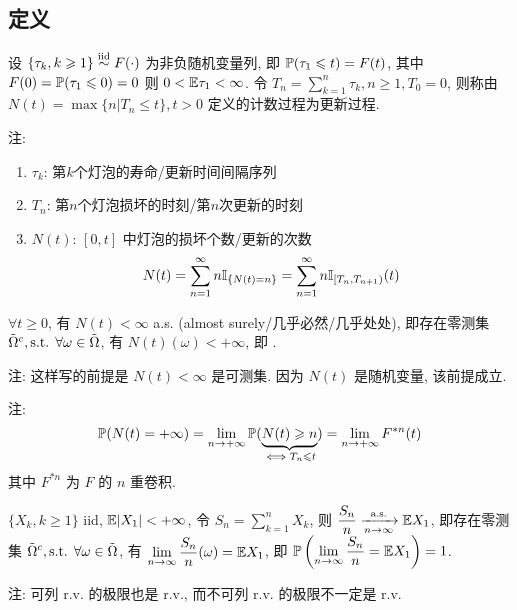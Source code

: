 \subsection{定义}

\begin{definition}
    设 $\{\tau_k,k\geqslant 1\}\overset{\text{iid}}{\sim} F(\cdot)$ 为非负随机变量列, 即 $\mathbb{P}(\tau_1\leqslant t)=F(t)$, 其中 $F(0)=\mathbb{P}(\tau_1\leqslant 0)=0$ 则 $0<\mathbb E \tau_1<\infty$. 令 $T_n=\sum_{k=1}^n\tau_k,n\geq 1,T_0=0$, 则称由 $N(t)=\max\{n|T_n\leq t\}, t>0$ 定义的计数过程为更新过程.  
\end{definition}
注:
\begin{enumerate}
    \item $\tau_k$: 第$k$个灯泡的寿命/更新时间间隔序列
    \item $T_n$: 第$n$个灯泡损坏的时刻/第$n$次更新的时刻
    \item $N(t)$: $[0,t]$ 中灯泡的损坏个数/更新的次数
    \[
    N(t)=\sum_{n=1}^{\infty}n\mathbb I_{\{N(t)=n\}}=\sum_{n=1}^{\infty}n\mathbb I_{[T_n,T_{n+1})}(t)
    \]
\end{enumerate}

\begin{lemma}\label{lem:p113-lem1}
    $\forall t\geq 0$, 有 $N(t)<\infty$ a.s. (almost surely/几乎必然/几乎处处), 即存在零测集 $\tilde{\Omega}^c,\text{s.t. } \forall \omega \in \tilde{\Omega}$, 有 $N(t)(\omega)<+\infty$, 即 .

    注: 这样写的前提是 $N(t)<\infty$ 是可测集. 因为 $N(t)$ 是随机变量, 该前提成立.
\end{lemma}

注:
\[
    \mathbb{P}(N(t)=+\infty)=\lim_{n\to +\infty}\mathbb{P}(\underbrace{N(t)\geqslant n}_{\iff T_n\leqslant t})=\lim_{n\to +\infty}F^{*n}(t)
\]
其中 $F^{*n}$ 为 $F$ 的 $n$ 重卷积.

\begin{theorem}[强大数定律]
    $\{X_k,k\geq 1\}$ iid, $\mathbb E |X_1|<+\infty$, 令 $S_n=\sum_{k=1}^nX_k$, 则 $\displaystyle \frac{S_n}{n}\xrightarrow[n\to\infty]{\text{a.s.}} \mathbb E X_1$, 即存在零测集 $\displaystyle \tilde{\Omega}^c,\text{s.t. } \forall \omega \in \tilde{\Omega}$, 有 $\displaystyle \lim_{n\to\infty}\frac{S_n}{n}(\omega)= \mathbb E X_1$, 即 $\displaystyle \mathbb{P}\left(\lim_{n\to\infty}\frac{S_n}{n}=\mathbb E X_1\right)=1$.
\end{theorem}
注: 可列 r.v. 的极限也是 r.v., 而不可列 r.v. 的极限不一定是 r.v.


